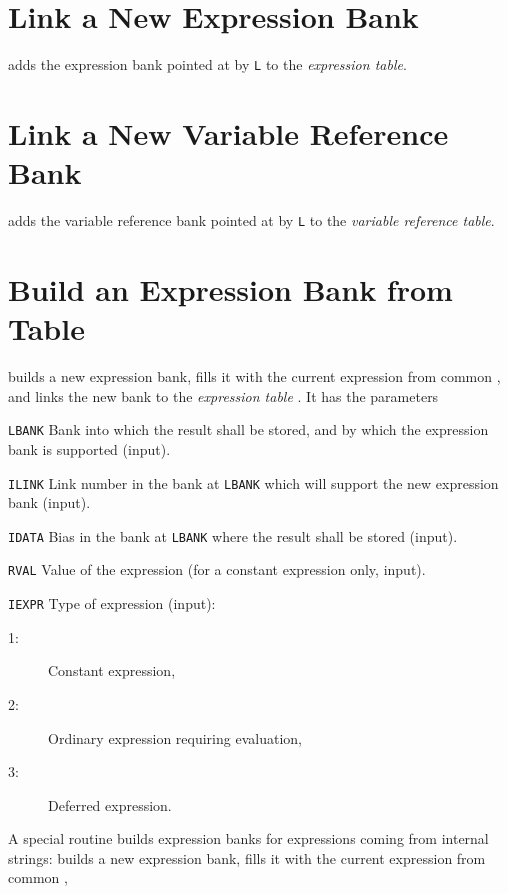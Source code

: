 \section{Link a New Expression Bank}
\label{EXLKEX}
adds the expression bank pointed at by {\tt L} to the
{\em expression table}.

\section{Link a New Variable Reference Bank}
\label{EXLKVR}
adds the variable reference bank pointed at by {\tt L} to the
{\em variable reference table}.

\section{Build an Expression Bank from Table}
\label{EXMAKE}
builds a new expression bank,
fills it with the current expression from common ,
and links the new bank to the {\em expression table}
.
It has the parameters
\begin{mylist}
\item[\tt LBANK]
Bank into which the result shall be stored,
and by which the expression bank is supported (input).
\item[\tt ILINK]
Link number in the bank at {\tt LBANK} which will support the
new expression bank (input).
\item[\tt IDATA]
Bias in the bank at {\tt LBANK} where the result shall be stored
(input).
\item[\tt RVAL]
Value of the expression (for a constant expression only, input).
\item[\tt IEXPR]
Type of expression (input):
\begin{description}
\item[1:] Constant expression,
\item[2:] Ordinary expression requiring evaluation,
\item[3:] Deferred expression.
\end{description}
\end{mylist}
A special routine builds expression banks for expressions coming from
internal strings:
\label{EXMAK1}
builds a new expression bank,
fills it with the current expression from common ,
